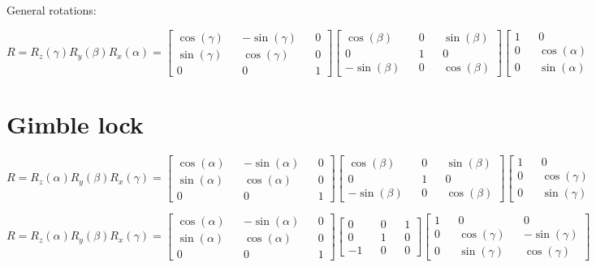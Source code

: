 \documentclass{article}
\begin{document}
General rotations:

$
R = R_z(\gamma) R_y(\beta) R_x(\alpha)
=
\begin{bmatrix}
    \cos(\gamma) && -\sin(\gamma) && 0\\
    \sin(\gamma) && \cos(\gamma) && 0\\
    0 && 0 && 1
\end{bmatrix}
\begin{bmatrix}
    \cos(\beta) && 0 && \sin(\beta) \\
    0 && 1 && 0\\
    -\sin(\beta) && 0 && \cos(\beta)
\end{bmatrix}
\begin{bmatrix}
    1 && 0 && 0 \\
    0 && \cos(\alpha) && -\sin(\alpha) \\
    0 && \sin(\alpha) && \cos(\alpha)
\end{bmatrix}
$

\section*{Gimble lock}

$
R = R_z(\alpha) R_y(\beta) R_x(\gamma)
=
\begin{bmatrix}
    \cos(\alpha) && -\sin(\alpha) && 0\\
    \sin(\alpha) && \cos(\alpha) && 0\\
    0 && 0 && 1
\end{bmatrix}
\begin{bmatrix}
    \cos(\beta) && 0 && \sin(\beta) \\
    0 && 1 && 0\\
    -\sin(\beta) && 0 && \cos(\beta)
\end{bmatrix}
\begin{bmatrix}
    1 && 0 && 0 \\
    0 && \cos(\gamma) && -\sin(\gamma) \\
    0 && \sin(\gamma) && \cos(\gamma)
\end{bmatrix}
$

$
R = R_z(\alpha) R_y(\beta) R_x(\gamma)
=
\begin{bmatrix}
    \cos(\alpha) && -\sin(\alpha) && 0\\
    \sin(\alpha) && \cos(\alpha) && 0\\
    0 && 0 && 1
\end{bmatrix}
\begin{bmatrix}
    0 && 0 && 1 \\
    0 && 1 && 0\\
    -1 && 0 && 0
\end{bmatrix}
\begin{bmatrix}
    1 && 0 && 0 \\
    0 && \cos(\gamma) && -\sin(\gamma) \\
    0 && \sin(\gamma) && \cos(\gamma)
\end{bmatrix}
$
\end{document}
